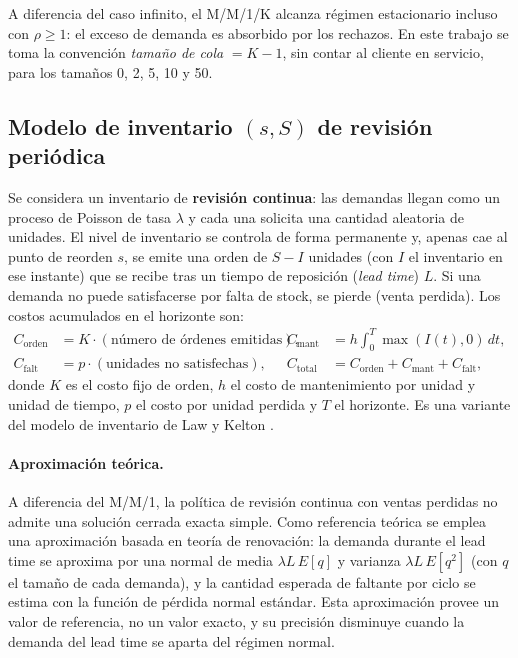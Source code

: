 \documentclass[11pt,a4paper]{article}
\begin{document}
A diferencia del caso infinito, el M/M/1/K alcanza régimen estacionario
incluso con $\rho \geq 1$: el exceso de demanda es absorbido por los
rechazos. En este trabajo se toma la convención \emph{tamaño de cola}
$=K-1$, sin contar al cliente en servicio, para los tamaños 0, 2, 5, 10
y 50.

\subsection{Modelo de inventario $(s,S)$ de revisión periódica}

Se considera un inventario de \textbf{revisión continua}: las demandas
llegan como un proceso de Poisson de tasa $\lambda$ y cada una solicita una
cantidad aleatoria de unidades. El nivel de inventario se controla de forma
permanente y, apenas cae al punto de reorden $s$, se emite una orden de
$S - I$ unidades (con $I$ el inventario en ese instante) que se recibe tras
un tiempo de reposición (\emph{lead time}) $L$. Si una demanda no puede
satisfacerse por falta de stock, se pierde (venta perdida). Los costos
acumulados en el horizonte son:
\begin{align}
    C_{\text{orden}} &= K \cdot (\text{número de órdenes emitidas}), &
    C_{\text{mant}} &= h \int_0^T \max(I(t), 0)\,dt, \\
    C_{\text{falt}} &= p \cdot (\text{unidades no satisfechas}), &
    C_{\text{total}} &= C_{\text{orden}} + C_{\text{mant}} + C_{\text{falt}},
\end{align}
donde $K$ es el costo fijo de orden, $h$ el costo de mantenimiento por
unidad y unidad de tiempo, $p$ el costo por unidad perdida y $T$ el
horizonte. Es una variante del modelo de inventario de Law y Kelton
\cite{lawkelton}.

\paragraph{Aproximación teórica.} A diferencia del M/M/1, la política de
revisión continua con ventas perdidas no admite una solución cerrada exacta
simple. Como referencia teórica se emplea una aproximación basada en teoría
de renovación: la demanda durante el lead time se aproxima por una normal de
media $\lambda L\,E[q]$ y varianza $\lambda L\,E[q^2]$ (con $q$ el tamaño de
cada demanda), y la cantidad esperada de faltante por ciclo se estima con la
función de pérdida normal estándar. Esta aproximación provee un valor de
referencia, no un valor exacto, y su precisión disminuye cuando la demanda
del lead time se aparta del régimen normal.
\end{document}
